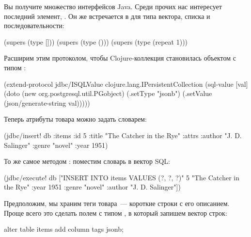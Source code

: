 Вы получите множество интерфейсов Java. Среди прочих нас интересует последний элемент, . Он же встречается в  для типа вектора, списка и последовательности:

\begin{english}
  \begin{clojure}
(supers (type []))
(supers (type ()))
(supers (type (repeat 1)))
  \end{clojure}
\end{english}

Расширим  этим протоколом, чтобы Clojure-коллекция становилась объектом  с типом :

\begin{english}
  \begin{clojure}
(extend-protocol jdbc/ISQLValue
  clojure.lang.IPersistentCollection
  (sql-value [val]
    (doto (new org.postgresql.util.PGobject)
      (.setType "jsonb")
      (.setValue (json/generate-string val)))))
  \end{clojure}
\end{english}

Теперь атрибуты товара можно задать словарем:

\begin{english}
  \begin{clojure}
(jdbc/insert! db :items
              {:id 5
               :title "The Catcher in the Rye"
               :attrs {:author "J. D. Salinger"
                       :genre "novel"
                       :year 1951}})
  \end{clojure}
\end{english}

То же самое методом : поместим словарь в вектор SQL:

\begin{english}
  \begin{clojure}
(jdbc/execute! db ["INSERT INTO items VALUES (?, ?, ?)"
               5
               "The Catcher in the Rye"
               {:year 1951 :genre "novel" :author "J. D. Salinger"}])
  \end{clojure}
\end{english}

Предположим, мы храним теги товара~--- короткие строки с его описанием. Проще всего это сделать полем  с типом , в который запишем вектор строк:

\begin{english}
  \begin{sql}
alter table items add column tags jsonb;
  \end{sql}
\end{english}

